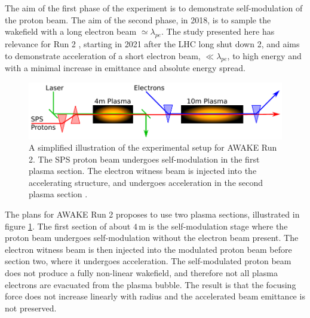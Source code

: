 \documentclass[aps,prstab,reprint,amsmath,amssymb,groupedaddress,onecolumn]{revtex4-1}
\newcommand{\unit}[1]{\,\mathrm{#1}}
\begin{document}
The aim of the first phase of the experiment is to demonstrate self-modulation of the proton beam. The aim of
the second phase, in 2018, is to sample the wakefield with a long electron beam $\simeq\lambda_{pe}$. The study presented
here has relevance for Run 2 \cite{adli:2016}, starting in 2021 after the LHC long shut down 2, and aims to demonstrate acceleration of a short electron beam, $\ll\lambda_{pe}$,
to high energy and with a minimal increase in emittance and absolute energy spread.

\begin{figure}[hbt]
    \includegraphics[width=0.99\linewidth,trim={1mm 2mm 1mm 2mm},clip]{figures/figAWAKE}
    \caption{\label{Fig:AWAKER2} A simplified illustration of the experimental setup for AWAKE Run 2. The SPS proton
        beam undergoes self-modulation in the first plasma section. The electron witness beam is injected into the
        accelerating structure, and undergoes acceleration in the second plasma section
        \cite{berglyd_olsen:2015, adli:2016}.}
\end{figure}

The plans for AWAKE Run 2 proposes to use two plasma sections, illustrated in figure \ref{Fig:AWAKER2}. The first
section of about $4\unit{m}$ is the self-modulation stage where the proton beam undergoes self-modulation without the electron
beam present. The electron witness beam is then injected into the modulated proton beam before section two, where it
undergoes acceleration. The self-modulated proton beam does not produce a fully non-linear wakefield, and
 therefore not all plasma electrons are evacuated from the plasma bubble. The result is that the focusing force does not
increase linearly with radius %
and the accelerated beam emittance is not preserved. 

\end{document}
